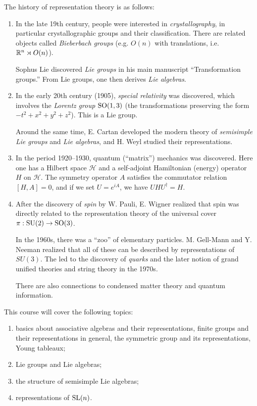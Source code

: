 The history of representation theory is as
follows:
\begin{enumerate}
    \item
    In the late 19th century, people
    were interested in \emph{crystallography},
    in particular crystallographic groups
    and their classification. There are
    related objects called \emph{Bieberbach groups} (e.g. $O(n)$ with translations, i.e.
    $\mathbb{R}^n \rtimes O(n)$).

    Sophus Lie discovered \emph{Lie groups}
    in his main manuscript ``Transformation
    groups.'' From Lie groups, one then derives
    \emph{Lie algebras}.

    \item
    In the early 20th century (1905),
    \emph{special relativity} was discovered,
    which involves the \emph{Lorentz group}
    $\operatorname{SO}(1, 3)$ (the transformations preserving
    the form $-t^2 + x^2 + y^2 + z^2$).
    This is a Lie group.

    Around the same time, E. Cartan developed
  the modern theory of \emph{semisimple Lie groups} and \emph{Lie algebras}, and
    H. Weyl studied their representations.

    \item
    In the period 1920--1930, quantum (``matrix'')
    mechanics was discovered. Here
    one has a Hilbert space $\mathcal{H}$ and
    a self-adjoint Hamiltonian (energy)
    operator $H$ on $\mathcal{H}$.
    The symmetry operator $A$ satisfies
    the commutator relation
    $[H, A] = 0$, and if we set $U = e^{iA}$,
    we have $U H U^\dagger = H$.

    \item
    After the discovery of \emph{spin} by W.
    Pauli, E. Wigner realized that spin was
    directly related to the representation
    theory of the universal cover
    $\pi : \operatorname{SU}(2) \to \operatorname{SO}(3)$.

    In the 1960s, there was a ``zoo'' of
    elementary particles. M. Gell-Mann and
    Y. Neeman realized that all of these
    can be described by representations of
    $SU(3)$. The led to the discovery of
    \emph{quarks} and the later
    notion of grand unified theories and
    string theory in the 1970s.

    There are also connections to condensed
    matter theory and quantum information.
\end{enumerate}

This course will cover the following topics:
\begin{enumerate}
  \item basics about associative algebras
    and their representations, finite groups
    and their representations in general,
    the symmetric group and its representations,
    Young tableaux;
  \item Lie groups and Lie algebras;
  \item the structure of semisimple Lie
    algebras;
  \item representations of $\operatorname{SL}(n)$.
\end{enumerate}

